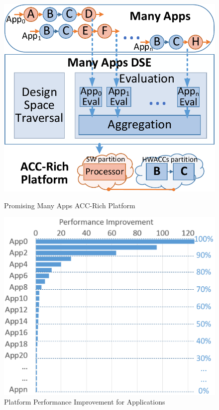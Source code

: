 \begin{figure}[ht]
  \centering
  \begin{minipage}[t]{0.22\textwidth}
    \includegraphics[width=.95\textwidth]{fig/MAARflow.pdf}
    \caption{Promising Many Apps ACC-Rich Platform}
    \label{fig:domainDSE}
  \end{minipage}%
  \hfill
  \begin{minipage}[t]{0.25\textwidth}
    \includegraphics[width=1\textwidth]{fig/Performance.pdf}
    \caption{Platform Performance Improvement for Applications}
	\label{fig:perf}
  \end{minipage}
\end{figure}

